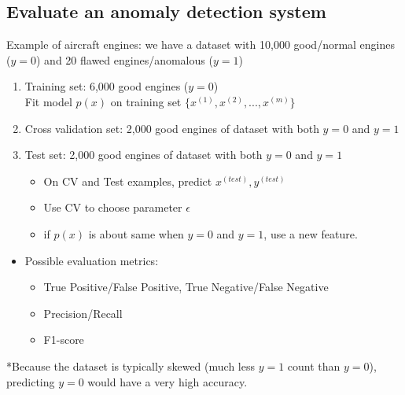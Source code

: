 \documentclass[a4paper,12pt]{report}
\begin{document}
\subsection{Evaluate an anomaly detection system}
Example of aircraft engines: we have a dataset with 10,000 good/normal engines ($y=0$) and 20 flawed engines/anomalous ($y=1$)
\begin{enumerate}
\item Training set: 6,000 good engines ($y=0$) \\
Fit model $p(x)$ on training set $\{x^{(1)}, x^{(2)}, ..., x^{(m)}  \}$
\item Cross validation set: 2,000 good engines of dataset with both $y=0$ and $y=1$
\item Test set: 2,000 good engines of dataset with both $y=0$ and $y=1$
\begin{itemize}
 \item On CV and Test examples, predict $x^{(test)}, y^{(test)}$
\item Use CV to choose parameter $\epsilon$
\item if $p(x)$ is about same when $y=0$ and $y=1$, use a new feature.
\end{itemize}
\end{enumerate}

\begin{itemize}
\item Possible evaluation metrics:
\begin{itemize}
\item True Positive/False Positive, True Negative/False Negative
\item Precision/Recall
\item F1-score
\end{itemize}
\end{itemize}
*Because the dataset is typically skewed (much less $y=1$ count than $y=0$), predicting $y=0$ would have a very high accuracy.
\end{document}
